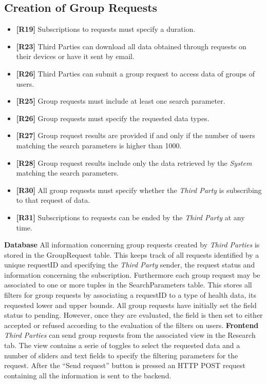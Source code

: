 \documentclass[titlepage]{article}
\begin{document}
	
	\subsection{Creation of Group Requests}
	\begin{itemize}
		\item {\bf [R19]} Subscriptions to requests must specify a duration.
		\item {\bf [R23]} Third Parties can download all data obtained through requests on their devices or have it sent by email.
		\item {\bf [R26]} Third Parties can submit a group request to access data of groups of users. 
		\item {\bf [R25]} Group requests must include at least one search parameter.
		\item {\bf [R26]} Group requests must specify the requested data types. 
		\item {\bf [R27]} Group request results are provided if and only if the number of users matching the search parameters is higher than 1000. 
		\item {\bf [R28]} Group request results include only the data retrieved by the {\it System} matching the search parameters. 
		\item {\bf [R30]} All group requests must specify whether the {\it Third Party} is subscribing to that request of data. 
		\item {\bf [R31]} Subscriptions to requests can be ended by the {\it Third Party} at any time.
	\end{itemize}	
	\noindent
	{\bf Database} \newline
	All information concerning group requests created by {\it Third Parties} is stored in the GroupRequest table. This keeps track of all requests identified by a unique requestID and specifying the {\it Third Party} sender, the request status and information concerning the subscription. Furthermore each group request may be associated to one or more tuples in the SearchParameters table. This stores all filters for group requests by associating a requestID to a type of health data, its requested lower and upper bounds.
	All group requests have initially set the field status to pending. However, once they are evaluated, the field is then set to either accepted or refused according to the evaluation of the filters on users.
	\newline
	\newline
	\noindent
	{\bf Frontend} \newline
	{\it Third Parties} can send group requests from the associated view in the Research tab. The view contains a serie of toggles to select the requested data and a number of sliders and text fields to specify the filtering parameters for the request. After the “Send request” button is pressed an HTTP POST request containing all the information is sent to the backend.
\end{document}
